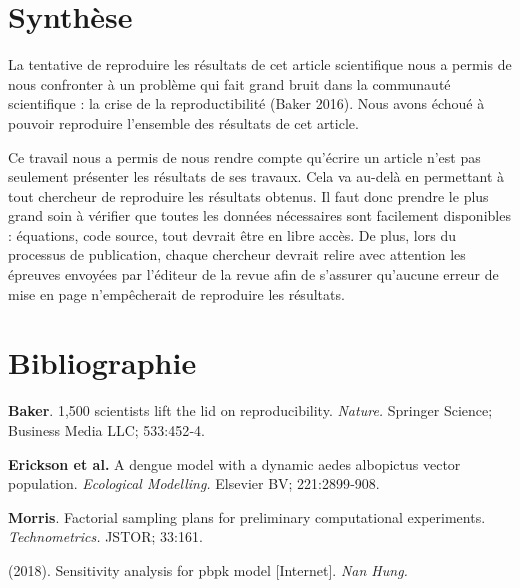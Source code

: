 \documentclass[
  12pt,
  french,
  oneside]{article}
\begin{document}
\hypertarget{synthuxe8se}{%
\section{Synthèse}\label{synthuxe8se}}

La tentative de reproduire les résultats de cet article scientifique
nous a permis de nous confronter à un problème qui fait grand bruit dans
la communauté scientifique : la crise de la reproductibilité (Baker
2016). Nous avons échoué à pouvoir reproduire l'ensemble des résultats
de cet article.

Ce travail nous a permis de nous rendre compte qu'écrire un article
n'est pas seulement présenter les résultats de ses travaux. Cela va
au-delà en permettant à tout chercheur de reproduire les résultats
obtenus. Il faut donc prendre le plus grand soin à vérifier que toutes
les données nécessaires sont facilement disponibles : équations, code
source, tout devrait être en libre accès. De plus, lors du processus de
publication, chaque chercheur devrait relire avec attention les épreuves
envoyées par l'éditeur de la revue afin de s'assurer qu'aucune erreur de
mise en page n'empêcherait de reproduire les résultats.

\hypertarget{bibliographie}{%
\section*{Bibliographie}\label{bibliographie}}

\hypertarget{refs}{}
\leavevmode\hypertarget{ref-Baker_2016}{}%
\textbf{Baker}. 1,500 scientists lift the lid on reproducibility.
\emph{Nature.} Springer Science; Business Media LLC; 533:452‑4.

\leavevmode\hypertarget{ref-Erickson_2010}{}%
\textbf{Erickson et al.} A dengue model with a dynamic aedes albopictus
vector population. \emph{Ecological Modelling.} Elsevier BV;
221:2899‑908.

\leavevmode\hypertarget{ref-Morris_1991}{}%
\textbf{Morris}. Factorial sampling plans for preliminary computational
experiments. \emph{Technometrics.} JSTOR; 33:161.

\leavevmode\hypertarget{ref-nanhung_2018}{}%
(2018). Sensitivity analysis for pbpk model {[}Internet{]}. \emph{Nan
Hung.}
\end{document}
